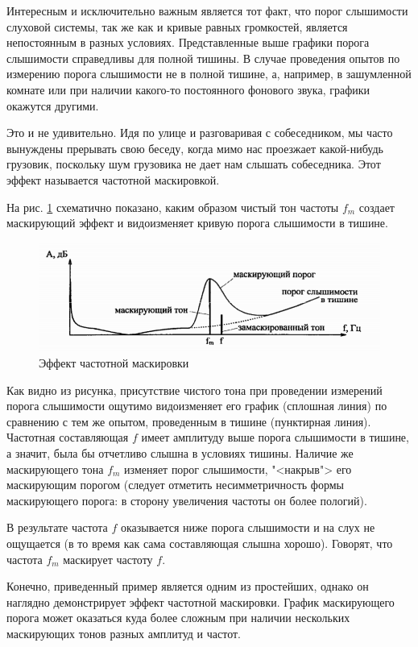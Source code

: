 \documentclass[oneside, final, 14pt]{extreport}
\begin{document}
Интересным и исключительно важным является тот факт, что порог слышимости слуховой системы, так же как и кривые равных громкостей, является непостоянным в разных условиях. Представленные выше графики порога слышимости справедливы для полной тишины. В случае проведения опытов по измерению порога слышимости не в полной тишине, а, например, в зашумленной комнате или при наличии какого-то постоянного фонового звука, графики окажутся другими. 

Это и не удивительно. Идя по улице и разговаривая с собеседником, мы часто вынуждены прерывать свою беседу, когда мимо нас проезжает какой-нибудь грузовик, поскольку шум грузовика не дает нам слышать собеседника. Этот эффект называется частотной маскировкой. 

На рис. \ref{pic-ear-12} схематично показано, каким образом чистый тон частоты $f_m$ создает маскирующий эффект и видоизменяет кривую порога слышимости в тишине.

\begin{figure}[h]
\centering
\includegraphics[scale=0.8]{pic-ear-12}
\caption{Эффект частотной маскировки}
\label{pic-ear-12}
\end{figure}

Как видно из рисунка, присутствие чистого тона при проведении измерений порога слышимости ощутимо видоизменяет его график (сплошная линия) по сравнению с тем же опытом, проведенным в тишине (пунктирная линия). Частотная составляющая $f$  имеет амплитуду выше порога слышимости в тишине, а значит, была бы отчетливо слышна в условиях тишины. Наличие же маскирующего тона $f_m$ изменяет порог слышимости, "<накрыв"> его маскирующим порогом (следует отметить несимметричность формы маскирующего порога: в сторону увеличения частоты он более пологий). 

В результате частота $f$ оказывается ниже порога слышимости и на слух не ощущается (в то время как сама составляющая слышна хорошо). Говорят, что частота $f_m$ маскирует частоту $f$. 

Конечно, приведенный пример является одним из простейших, однако он наглядно демонстрирует эффект частотной маскировки. График маскирующего порога может оказаться куда более сложным
при наличии нескольких маскирующих тонов разных амплитуд и частот.
\end{document}
